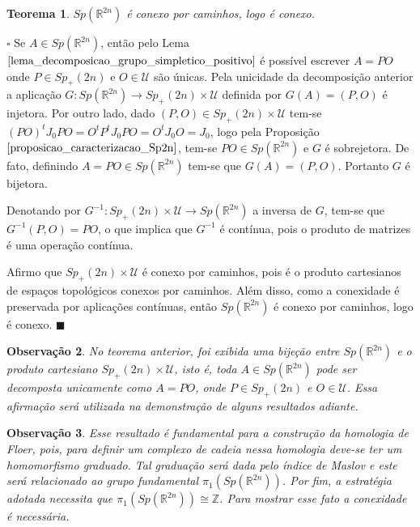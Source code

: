 \documentclass[12pt]{book}
\newtheorem{teorema}{Teorema}[section]
\newtheorem{observacao}[teorema]{Observação}
\newenvironment{prova}[1]{$\square$ #1}{\hfill$\blacksquare$}
\newcommand{\estruturacomplexa}{J_{0}}
\newcommand{\grupofundamental}[1]{\pi_{1}(#1)}
\newcommand{\gruposimpletico}[1]{Sp(#1)}
\newcommand{\gruposimpleticopositivo}[1]{Sp_{+}(#1)}
\newcommand{\inteiros}{\mathbb{Z}}
\newcommand{\matrizSimpleticaOrtogonal}{\mathcal{U}}
\newcommand{\real}[1]{\mathbb{R}^{#1}}
\begin{document}
	\begin{teorema}\label{teoerma_sp2n_conexo}
		$\gruposimpletico{\real{2n}}$ é conexo por caminhos, logo é conexo.
	\end{teorema}
	\begin{prova}
		Se $A \in \gruposimpletico{\real{2n}}$, então pelo Lema $\ref{lema_decomposicao_grupo_simpletico_positivo}$ é possível escrever $A=PO$ onde $P \in \gruposimpleticopositivo{2n}$ e $O\in \matrizSimpleticaOrtogonal$ são únicas. Pela unicidade da decomposição anterior a aplicação $G: \gruposimpletico{\real{2n}} \to \gruposimpleticopositivo{2n} \times \matrizSimpleticaOrtogonal$ definida por $G(A) = (P,O)$ é injetora. Por outro lado, dado $(P,O) \in \gruposimpleticopositivo{2n} \times \matrizSimpleticaOrtogonal$ tem-se $(PO)^{t}\estruturacomplexa PO = O^{t}P^{t}\estruturacomplexa PO = O^{t}\estruturacomplexa O = \estruturacomplexa$, logo pela Proposição $\ref{proposicao_caracterizacao_Sp2n}$, tem-se $PO \in \gruposimpletico{\real{2n}}$ e $G$ é sobrejetora. De fato, definindo $A=PO \in \gruposimpletico{\real{2n}}$ tem-se que $G(A) = (P,O)$. Portanto $G$ é bijetora. 
		
		Denotando por $G^{-1}:\gruposimpleticopositivo{2n} \times \matrizSimpleticaOrtogonal\to \gruposimpletico{\real{2n}}$ a inversa de $G$, tem-se que $G^{-1}(P,O) = PO$, o que implica que $G^{-1}$ é contínua, pois o produto de matrizes é uma operação contínua.
		
		Afirmo que $\gruposimpleticopositivo{2n}\times \matrizSimpleticaOrtogonal$ é conexo por caminhos, pois é o produto cartesianos de espaços topológicos conexos por caminhos. Além disso, como a conexidade é preservada por aplicações contínuas, então $\gruposimpletico{\real{2n}}$ é conexo por caminhos, logo é conexo.
	\end{prova}
	
	\begin{observacao}\label{observacao_decomposicao_Sp2n}
		No teorema anterior, foi exibida uma bijeção entre $\gruposimpletico{\real{2n}} $ e o produto cartesiano $\gruposimpleticopositivo{2n} \times \matrizSimpleticaOrtogonal$, isto é, toda $A \in \gruposimpletico{\real{2n}}$ pode ser decomposta unicamente como $A=PO$, onde $P\in \gruposimpleticopositivo{2n}$ e $O \in \matrizSimpleticaOrtogonal$. Essa afirmação será utilizada na demonstração de alguns resultados adiante.
	\end{observacao}
	
	\begin{observacao}\label{observacao_conexidade_grupo_simpletico}
		Esse resultado é fundamental para a construção da homologia de Floer, pois, para definir um complexo de cadeia nessa homologia deve-se ter um homomorfismo graduado. Tal graduação será dada pelo índice de Maslov e este será relacionado ao grupo fundamental $\grupofundamental{\gruposimpletico{\real{2n}}}$. Por fim, a estratégia adotada necessita que $\grupofundamental{\gruposimpletico{\real{2n}}} \cong \inteiros$. Para mostrar esse fato a conexidade é necessária.
	\end{observacao}
	
\end{document}
